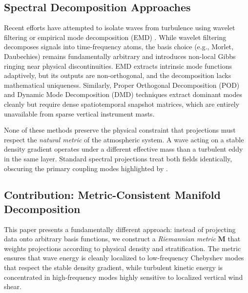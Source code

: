 \documentclass[11pt,a4paper]{article}
\begin{document}
\subsection{Spectral Decomposition Approaches}

Recent efforts have attempted to isolate waves from turbulence using wavelet filtering \citep{Vosper2006, Sun2015} or empirical mode decomposition (EMD) \citep{Huang1998}. While wavelet filtering decomposes signals into time-frequency atoms, the basis choice (e.g., Morlet, Daubechies) remains fundamentally arbitrary and introduces non-local Gibbs ringing near physical discontinuities. EMD extracts intrinsic mode functions adaptively, but its outputs are non-orthogonal, and the decomposition lacks mathematical uniqueness. Similarly, Proper Orthogonal Decomposition (POD) and Dynamic Mode Decomposition (DMD) techniques \citep{Schmid2010} extract dominant modes cleanly but require dense spatiotemporal snapshot matrices, which are entirely unavailable from sparse vertical instrument masts.

None of these methods preserve the physical constraint that projections must respect the \emph{natural metric} of the atmospheric system. A wave acting on a stable density gradient operates under a different effective mass than a turbulent eddy in the same layer. Standard spectral projections treat both fields identically, obscuring the primary coupling modes highlighted by \citet{Sun2015}.

\subsection{Contribution: Metric-Consistent Manifold Decomposition}

This paper presents a fundamentally different approach: instead of projecting data onto arbitrary basis functions, we construct a \emph{Riemannian metric} $\mathbf{M}$ that weights projections according to physical density and stratification. The metric ensures that wave energy is cleanly localized to low-frequency Chebyshev modes that respect the stable density gradient, while turbulent kinetic energy is concentrated in high-frequency modes highly sensitive to localized vertical wind shear. 
\end{document}
